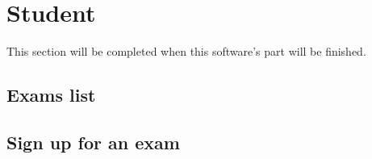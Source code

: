\documentclass[ManualeUtente]{subfiles}
\begin{document}
\chapter{Student}
This section will be completed when this software's part will be finished.
\section{Exams list}
\section{Sign up for an exam}
\end{document}
